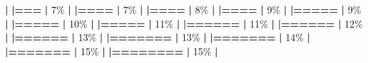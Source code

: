 \documentclass[
]{book}
\newenvironment{Shaded}{\begin{snugshade}}{\end{snugshade}}
\newcommand{\DecValTok}[1]{\textcolor[rgb]{0.00,0.00,0.81}{#1}}
\newcommand{\ErrorTok}[1]{\textcolor[rgb]{0.64,0.00,0.00}{\textbf{#1}}}
\newcommand{\NormalTok}[1]{#1}
\newcommand{\SpecialCharTok}[1]{\textcolor[rgb]{0.81,0.36,0.00}{\textbf{#1}}}
\begin{document}
\begin{Shaded}
\begin{Highlighting}[]
  \SpecialCharTok{|}                                                        
  \ErrorTok{|===}                                               \ErrorTok{|}   \DecValTok{7}\NormalTok{\%}
  \SpecialCharTok{|}                                                        
  \ErrorTok{|====}                                              \ErrorTok{|}   \DecValTok{7}\NormalTok{\%}
  \SpecialCharTok{|}                                                        
  \ErrorTok{|====}                                              \ErrorTok{|}   \DecValTok{8}\NormalTok{\%}
  \SpecialCharTok{|}                                                        
  \ErrorTok{|====}                                              \ErrorTok{|}   \DecValTok{9}\NormalTok{\%}
  \SpecialCharTok{|}                                                        
  \ErrorTok{|=====}                                             \ErrorTok{|}   \DecValTok{9}\NormalTok{\%}
  \SpecialCharTok{|}                                                        
  \ErrorTok{|=====}                                             \ErrorTok{|}  \DecValTok{10}\NormalTok{\%}
  \SpecialCharTok{|}                                                        
  \ErrorTok{|=====}                                             \ErrorTok{|}  \DecValTok{11}\NormalTok{\%}
  \SpecialCharTok{|}                                                        
  \ErrorTok{|======}                                            \ErrorTok{|}  \DecValTok{11}\NormalTok{\%}
  \SpecialCharTok{|}                                                        
  \ErrorTok{|======}                                            \ErrorTok{|}  \DecValTok{12}\NormalTok{\%}
  \SpecialCharTok{|}                                                        
  \ErrorTok{|======}                                            \ErrorTok{|}  \DecValTok{13}\NormalTok{\%}
  \SpecialCharTok{|}                                                        
  \ErrorTok{|=======}                                           \ErrorTok{|}  \DecValTok{13}\NormalTok{\%}
  \SpecialCharTok{|}                                                        
  \ErrorTok{|=======}                                           \ErrorTok{|}  \DecValTok{14}\NormalTok{\%}
  \SpecialCharTok{|}                                                        
  \ErrorTok{|=======}                                           \ErrorTok{|}  \DecValTok{15}\NormalTok{\%}
  \SpecialCharTok{|}                                                        
  \ErrorTok{|========}                                          \ErrorTok{|}  \DecValTok{15}\NormalTok{\%}
  \SpecialCharTok{|}                                                        

\end{Highlighting}
\end{Shaded}
\end{document}
